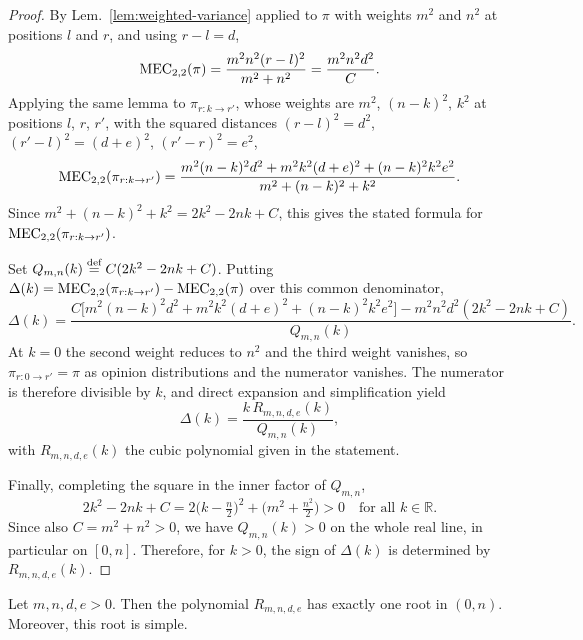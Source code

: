 \begin{proof}
By Lem.~\ref{lem:weighted-variance} applied to \(\pi\) with weights \(m^2\) and \(n^2\) at positions \(l\) and \(r\), and using \(r-l=d\),
\[
\MEC[2,2](\pi)=\frac{m^2n^2(r-l)^2}{m^2+n^2}=\frac{m^2n^2d^2}{C}.
\]
Applying the same lemma to \(\pi_{r:k\rightarrow r'}\), whose weights are \(m^2\), \((n-k)^2\), \(k^2\) at positions \(l\), \(r\), \(r'\), with the squared distances \((r-l)^2=d^2\), \((r'-l)^2=(d+e)^2\), \((r'-r)^2=e^2\),
\[
\MEC[2,2](\pi_{r:k\rightarrow r'})
=
\frac{m^2(n-k)^2d^2+m^2k^2(d+e)^2+(n-k)^2k^2e^2}{m^2+(n-k)^2+k^2}.
\]
Since \(m^2+(n-k)^2+k^2=2k^2-2nk+C\), this gives the stated formula for \(\MEC[2,2](\pi_{r:k\rightarrow r'})\).

Set \(Q_{m,n}(k)\stackrel{\text{def}}{=} C(2k^2-2nk+C)\). Putting \(\Delta(k)=\MEC[2,2](\pi_{r:k\rightarrow r'})-\MEC[2,2](\pi)\) over this common denominator,
\[
\Delta(k)
=
\frac{C\bigl[m^2(n-k)^2d^2+m^2k^2(d+e)^2+(n-k)^2k^2e^2\bigr]-m^2n^2d^2(2k^2-2nk+C)}{Q_{m,n}(k)}.
\]
At \(k=0\) the second weight reduces to \(n^2\) and the third weight vanishes, so \(\pi_{r:0\rightarrow r'}=\pi\) as opinion distributions and the numerator vanishes. The numerator is therefore divisible by \(k\), and direct expansion and simplification yield
\[
\Delta(k)=\frac{k\,R_{m,n,d,e}(k)}{Q_{m,n}(k)},
\]
with \(R_{m,n,d,e}(k)\) the cubic polynomial given in the statement.

Finally, completing the square in the inner factor of \(Q_{m,n}\),
\[
2k^2-2nk+C
=2\bigl(k-\tfrac{n}{2}\bigr)^{2}+\bigl(m^2+\tfrac{n^2}{2}\bigr)>0
\quad\text{for all }k\in\mathbb{R}.
\]
Since also \(C=m^2+n^2>0\), we have \(Q_{m,n}(k)>0\) on the whole real line, in particular on \([0,n]\). Therefore, for \(k>0\), the sign of \(\Delta(k)\) is determined by \(R_{m,n,d,e}(k)\).
\end{proof}

\begin{proposition}
\label{prop:unique-root-tipping-general}
Let \(m,n,d,e>0\). Then the polynomial \(R_{m,n,d,e}\) has exactly one root in \((0,n)\). Moreover, this root is simple.
\end{proposition}


